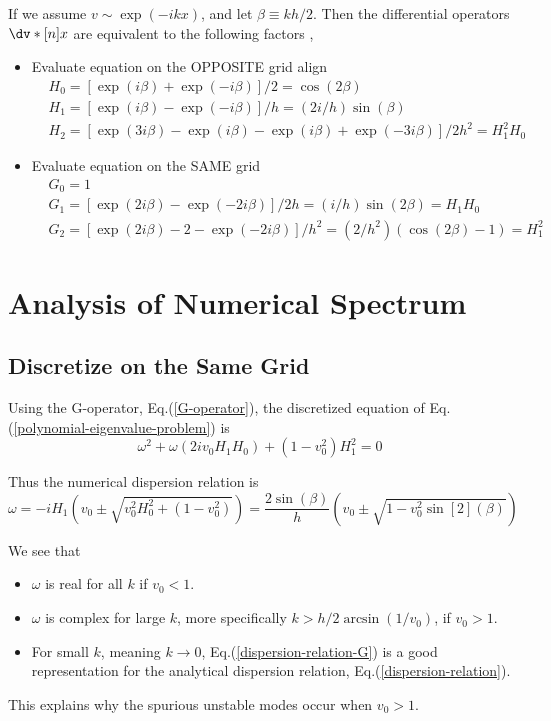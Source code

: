 If we assume $v\sim \exp(-ikx)$, and let $\beta\equiv kh/2$. Then the differential operators $\dv*[n]{x}$ are equivalent to the following factors \cite{llobet_spectral_1990},
\begin{itemize}
	\item Evaluate equation on the OPPOSITE grid
	align
	\begin{align}
		&H_0 = [\exp(i\beta)+\exp(-i\beta)]/2 = \cos(2\beta) \nonumber \\
		&H_1 = [\exp(i\beta)-\exp(-i\beta)]/h = (2i/h)\sin(\beta) 
		\label{H-operator} \\
		&H_2 = [\exp(3i\beta)-\exp(i\beta)-\exp(i\beta)+\exp(-3i\beta)]/2h^2 = H_1^2H_0 \nonumber 
	\end{align}
	
	\item Evaluate equation on the SAME grid
	\begin{align}
		&G_0 = 1 \nonumber \\
		&G_1 = [\exp(2i\beta)-\exp(-2i\beta)]/2h = (i/h)\sin(2\beta) = H_1H_0 
		\label{G-operator}\\
		&G_2 = [\exp(2i\beta)-2-\exp(-2i\beta)]/h^2 = (2/h^2)(\cos(2\beta)-1) = H_1^2 \nonumber 
	\end{align}
\end{itemize}


\section{Analysis of Numerical Spectrum}
\subsection{Discretize on the Same Grid}
Using the G-operator, Eq.(\ref{G-operator}), the discretized equation of Eq.(\ref{polynomial-eigenvalue-problem}) is 
\[ \omega^2 + \omega(2iv_0H_1H_0) + (1-v_0^2)H_1^2 = 0 \]

Thus the numerical dispersion relation is
\begin{equation} \label{dispersion-relation-G}
	\omega = -iH_1 \left(v_0 \pm \sqrt{v_0^2H_0^2 + (1-v_0^2)}\right) = \frac{2\sin(\beta)}{h}\left(v_0 \pm \sqrt{1 - v_0^2\sin[2](\beta)}\right)
\end{equation}

We see that 
\begin{itemize}
	\item $\omega$ is real for all $k$ if $v_0 < 1$.
	\item $\omega$ is complex for large $k$, more specifically $k>h/2\arcsin(1/v_0)$, if $v_0 > 1$.
	\item For small $k$, meaning $k\to 0$, Eq.(\ref{dispersion-relation-G}) is a good representation for the analytical dispersion relation, Eq.(\ref{dispersion-relation}). 
\end{itemize}
This explains why the spurious unstable modes occur when $v_0>1$.


